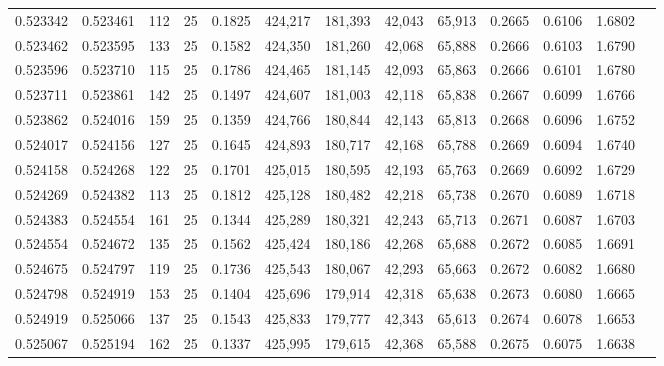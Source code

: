 \begin{tabular}{rrrrrrrrrrrrr}
0.523342 & 0.523461 &   112 &  25 &                                     0.1825 & 424,217 & 181,393 &  42,043 &  65,913 & 0.2665 & 0.6106 & 1.6802 \\
0.523462 & 0.523595 &   133 &  25 &                                     0.1582 & 424,350 & 181,260 &  42,068 &  65,888 & 0.2666 & 0.6103 & 1.6790 \\
0.523596 & 0.523710 &   115 &  25 &                                     0.1786 & 424,465 & 181,145 &  42,093 &  65,863 & 0.2666 & 0.6101 & 1.6780 \\
0.523711 & 0.523861 &   142 &  25 &                                     0.1497 & 424,607 & 181,003 &  42,118 &  65,838 & 0.2667 & 0.6099 & 1.6766 \\
0.523862 & 0.524016 &   159 &  25 &                                     0.1359 & 424,766 & 180,844 &  42,143 &  65,813 & 0.2668 & 0.6096 & 1.6752 \\
0.524017 & 0.524156 &   127 &  25 &                                     0.1645 & 424,893 & 180,717 &  42,168 &  65,788 & 0.2669 & 0.6094 & 1.6740 \\
0.524158 & 0.524268 &   122 &  25 &                                     0.1701 & 425,015 & 180,595 &  42,193 &  65,763 & 0.2669 & 0.6092 & 1.6729 \\
0.524269 & 0.524382 &   113 &  25 &                                     0.1812 & 425,128 & 180,482 &  42,218 &  65,738 & 0.2670 & 0.6089 & 1.6718 \\
0.524383 & 0.524554 &   161 &  25 &                                     0.1344 & 425,289 & 180,321 &  42,243 &  65,713 & 0.2671 & 0.6087 & 1.6703 \\
0.524554 & 0.524672 &   135 &  25 &                                     0.1562 & 425,424 & 180,186 &  42,268 &  65,688 & 0.2672 & 0.6085 & 1.6691 \\
0.524675 & 0.524797 &   119 &  25 &                                     0.1736 & 425,543 & 180,067 &  42,293 &  65,663 & 0.2672 & 0.6082 & 1.6680 \\
0.524798 & 0.524919 &   153 &  25 &                                     0.1404 & 425,696 & 179,914 &  42,318 &  65,638 & 0.2673 & 0.6080 & 1.6665 \\
0.524919 & 0.525066 &   137 &  25 &                                     0.1543 & 425,833 & 179,777 &  42,343 &  65,613 & 0.2674 & 0.6078 & 1.6653 \\
0.525067 & 0.525194 &   162 &  25 &                                     0.1337 & 425,995 & 179,615 &  42,368 &  65,588 & 0.2675 & 0.6075 & 1.6638 \\

\end{tabular}
